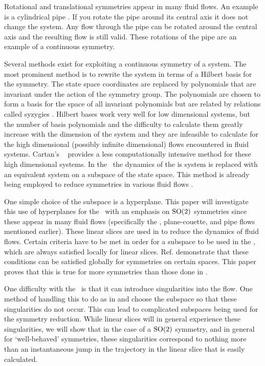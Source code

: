 Rotational and translational symmetries appear in many fluid flows. An example is a cylindrical pipe . If you rotate the pipe around its central axis it does not change the system. Any flow through the pipe can be rotated around the central axis and the resulting flow is still valid. These rotations of the pipe are an example of a continuous symmetry.

Several methods exist for exploiting a continuous symmetry of a system. The most prominent method is to rewrite the system in terms of a Hilbert basis for the symmetry. The state space coordinates are replaced by polynomials that are invariant under the action of the symmetry group. The polynomials are chosen to form a basis for the space of all invariant polynomials but are related by relations called syzygies . Hilbert bases work very well for low dimensional systems, but the number of basis polynomials and the difficulty to calculate them greatly increase with the dimension of the system and they are infeasible to calculate for the high dimensional (possibly infinite dimensional) flows encountered in fluid systems. Cartan's \mslices\  provides a less computationally intensive method for these high dimensional systems. In the \mslices\ the dynamics of the is system is replaced with an equivalent system on a subspace of the state space. This method is already being employed to reduce symmetries in various fluid flows .

One simple choice of the subspace is a hyperplane. This paper will investigate this use of hyperplanes for the \mslices\ with an emphasis on $\textrm{SO}(2)$ symmetries since these appear in many fluid flows (specifically the \KS, plane-couette, and pipe flows mentioned earlier). These linear slices are used in  to reduce the dynamics of fluid flows. Certain criteria have to be met in order for a subspace to be used in the \mslices, which are always satisfied locally for linear slices. Ref. demonstrate that these conditions can be satisfied globally for symmetries on certain spaces. This paper proves that this is true for more symmetries than those done in .

One difficulty with the \mslices\ is that it can introduce singularities into the flow. One method of handling this to do as in  and choose the subspace so that these singularities do not occur. This can lead to complicated subspaces being used for the symmetry reduction. While linear slices will in general experience these singularities, we will show that in the case of a $\textrm{SO}(2)$ symmetry, and in general for `well-behaved' symmetries, these singularities correspond to nothing more than an instantaneous jump in the trajectory in the linear slice that is easily calculated.

